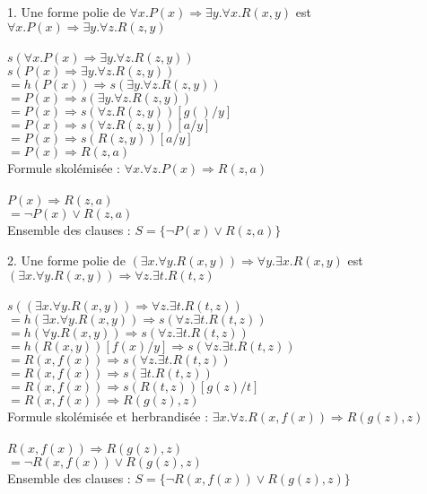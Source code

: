 \documentclass[11pt,letterpaper]{article}
\newcommand\tab[1][12pt]{\hspace*{#1}}
\begin{document}
1.  Une forme polie de $\forall x.P(x)\Rightarrow \exists y.\forall x.R(x,y)$ est $\forall x.P(x)\Rightarrow \exists y.\forall z.R(z,y)$\\\tab
\\\tab
$s(\forall x.P(x)\Rightarrow \exists y.\forall z.R(z,y))$\\\tab
$s(P(x)\Rightarrow \exists y.\forall z.R(z,y))$\\\tab
$= h(P(x))\Rightarrow s(\exists y.\forall z.R(z,y))$\\\tab
$= P(x)\Rightarrow s(\exists y.\forall z.R(z,y))$\\\tab
$= P(x)\Rightarrow s(\forall z.R(z,y))[g()/y]$\\\tab
$= P(x)\Rightarrow s(\forall z.R(z,y))[a/y]$\\\tab
$= P(x)\Rightarrow s(R(z,y))[a/y]$\\\tab
$= P(x)\Rightarrow R(z,a)$\\\tab
Formule skolémisée : $\forall x.\forall z.P(x)\Rightarrow R(z,a)$\\\tab
\\\tab
$P(x)\Rightarrow R(z,a)$\\\tab
$= \neg P(x)\lor R(z,a)$\\\tab
Ensemble des clauses : $S = \{\neg P(x)\lor R(z,a)\}$\\

\newpage

2.  Une forme polie de $(\exists x.\forall y.R(x,y)) \Rightarrow \forall y.\exists x.R(x,y)$ est $(\exists x.\forall y.R(x,y)) \Rightarrow \forall z.\exists t.R(t,z)$\\\tab
\\\tab
$s((\exists x.\forall y.R(x,y)) \Rightarrow \forall z.\exists t.R(t,z))$\\\tab
$= h(\exists x.\forall y.R(x,y)) \Rightarrow s(\forall z.\exists t.R(t,z))$\\\tab
$= h(\forall y.R(x,y)) \Rightarrow s(\forall z.\exists t.R(t,z))$\\\tab
$= h(R(x,y))[f(x)/y] \Rightarrow s(\forall z.\exists t.R(t,z))$\\\tab
$= R(x,f(x)) \Rightarrow s(\forall z.\exists t.R(t,z))$\\\tab
$= R(x,f(x)) \Rightarrow s(\exists t.R(t,z))$\\\tab
$= R(x,f(x)) \Rightarrow s(R(t,z))[g(z)/t]$\\\tab
$= R(x,f(x)) \Rightarrow R(g(z),z)$\\\tab
Formule skolémisée et herbrandisée : $\exists x.\forall z.R(x,f(x)) \Rightarrow R(g(z),z)$\\\tab
\\\tab
$R(x,f(x)) \Rightarrow R(g(z),z)$\\\tab
$= \neg R(x,f(x))\lor R(g(z),z)$\\\tab
Ensemble des clauses : $S = \{\neg R(x,f(x))\lor R(g(z),z)\}$\\
\end{document}
